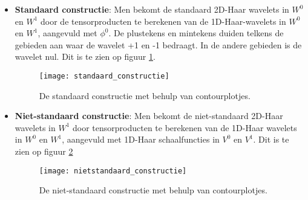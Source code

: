 \begin{enumerate}
	{\begin{itemize} 
		\item \textbf{Standaard constructie}:
		Men bekomt de standaard 2D-Haar wavelets in $W^0$ en $W^1$ door de tensorproducten te berekenen van de 1D-Haar-wavelets in $W^0$ en $W^1$, aangevuld met $\phi^0$. De plustekens en mintekens duiden telkens de gebieden aan waar de wavelet +1 en -1 bedraagt. In de andere gebieden is de wavelet nul. Dit is te zien op figuur \ref{fig:standaard_constructie}.
		\begin{figure}[ht]
			\centering
			\texttt{[image: standaard\_constructie]}
			\caption{De standaard constructie met behulp van contourplotjes.}
			\label{fig:standaard_constructie}
		\end{figure}
		\item \textbf{Niet-standaard constructie}: Men bekomt de niet-standaard 2D-Haar wavelets in $W^1$ door tensorproducten te berekenen van de 1D-Haar wavelets in $W^0$ en $W^1$, aangevuld met 1D-Haar schaalfuncties in $V^0$ en $V^1$. Dit is te zien op figuur \ref{fig:nietstandaard_constructie}
		\begin{figure}[ht]
			\centering
			\texttt{[image: nietstandaard\_constructie]}
			\caption{De niet-standaard constructie met behulp van contourplotjes.}
			\label{fig:nietstandaard_constructie}
		\end{figure}
	 \end{itemize}}
\end{enumerate}

